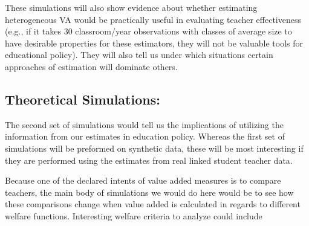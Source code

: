 \documentclass[letterpaper,12pt]{article}
\begin{document}
These simulations will also show evidence about whether estimating heterogeneous VA would be practically useful in evaluating teacher effectiveness (e.g., if it takes 30 classroom/year observations with classes of average size to have desirable properties for these estimators, they will not be valuable tools for educational policy). They will also tell us under which situations certain approaches of estimation will dominate others.






%


\subsection{Theoretical Simulations:}

The second set of simulations would tell us the implications of utilizing the information from our estimates in education policy. Whereas the first set of simulations will be preformed on synthetic data, these will be most interesting if they are performed using the estimates from real linked student teacher data.

Because one of the declared intents of value added measures is to compare teachers, the main body of simulations we would do here would be to see how these comparisons change when value added is calculated in regards to different welfare functions. Interesting welfare criteria to analyze could include
\end{document}
